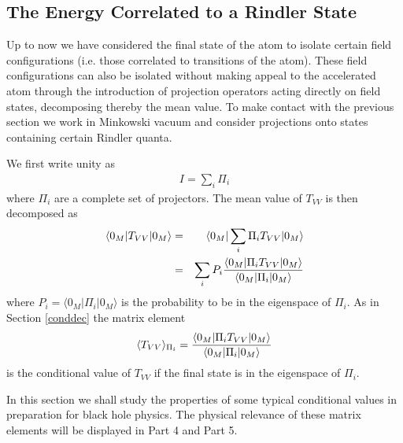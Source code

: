 \subsection{The Energy Correlated to a Rindler State}\label{corrR}

Up to now we have considered the final state of the atom
to  isolate certain field configurations (i.e. those
correlated to transitions of the atom). These field
configurations can also be isolated without making appeal
to the accelerated atom through the
introduction of projection operators acting directly
on field states, decomposing thereby the
mean value. To make contact with the previous section we
work in Minkowski vacuum and consider projections onto
states containing certain Rindler quanta.

We first write
unity as
\begin{eqnarray}
I = \sum_i \Pi_i
\end{eqnarray}
 where $\Pi_i$ are a complete set of projectors.
The mean value of $T_{VV}$ is then decomposed as
\begin{eqnarray}
\langle 0_M \vert T_{VV} \vert 0_M \rangle &=&
\langle 0_M \vert \sum_i \Pi_i T_{VV} \vert 0_M \rangle
\nonumber\\
&=& \sum_i P_i {
\langle 0_M \vert  \Pi_i T_{VV} \vert 0_M \rangle
\over
\langle 0_M \vert \Pi_i \vert 0_M \rangle  }
\label{r1}
\end{eqnarray}
where $P_i = \langle 0_M \vert \Pi_i \vert 0_M \rangle$
is the probability to be in the eigenspace of $\Pi_i$. As
in Section \ref{conddec} the matrix element
\begin{eqnarray}
\langle T_{VV} \rangle_{\Pi_i}=
{\langle 0_M \vert  \Pi_i T_{VV} \vert 0_M \rangle \over
\langle 0_M \vert \Pi_i \vert 0_M \rangle}
\label{TPi}
\end{eqnarray}
is the
conditional value of $T_{VV}$ if the final state is in
the eigenspace of $\Pi_i$.

In this section we shall study the properties
of some
typical conditional values in preparation for black hole
physics.
The physical relevance of these matrix elements
will be displayed in Part 4 and Part 5.

